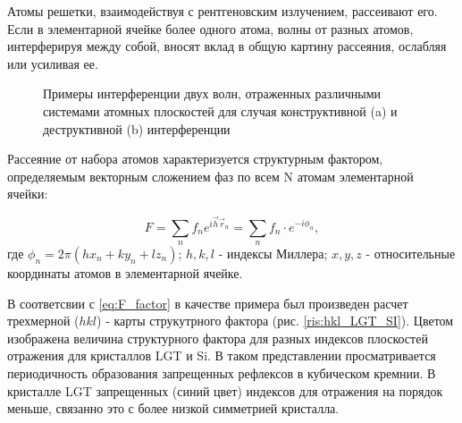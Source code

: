 \label{sec:structure_factor}
Атомы решетки, взаимодействуя с рентгеновским излучением, рассеивают его.
Если в элементарной ячейке более одного атома, волны от разных атомов,
 интерферируя между собой, вносят вклад в общую картину рассеяния,
 ослабляя или усиливая ее.

 \begin{figure}[H]
   \centering
   \hfill
   \caption{Примеры интерференции двух волн, отраженных различными системами атомных плоскостей для случая
   конструктивной (a) и деструктивной (b) интерференции}
   \label{ris:interference_by_plate}
 \end{figure}

Рассеяние от набора атомов характеризуется структурным фактором, определяемым векторным
 сложением фаз по всем N атомам элементарной ячейки:

 \begin{equation}
   F = \sum_{n} f_n e^{ i\vec{h}\vec{r}_n} =   \sum_{n} f_n \cdot e^{-i\phi_n},
   \label{eq:F_factor}
  \end{equation}
\noindent
где $\phi_n = 2 \pi (hx_n+ky_n+lz_n)$;  $h, k, l$ - индексы Миллера; $x, y, z$ - относительные координаты
атомов в элементарной ячейке.

В соответсвии с \ref{eq:F_factor} в качестве примера был произведен расчет трехмерной ($hkl$) -
карты струкутрного фактора (рис. \ref{ris:hkl_LGT_SI}).
Цветом изображена величина структурного фактора для разных
 индексов плоскостей отражения для кристаллов LGT и Si.
 В таком представлении просматривается периодичность образования запрещенных
 рефлексов в кубическом кремнии. В кристалле LGT запрещенных (синий цвет)
  индексов для отражения на порядок меньше, связанно это с более низкой
  симметрией кристалла.

